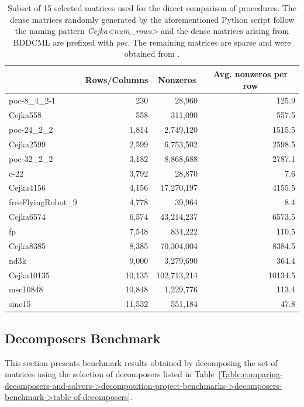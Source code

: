 \begin{table}[ht!]
	\centering
	\begin{tabular}{|l|r|r|r|}
		\hline
		\rowcolor[HTML]{C0C0C0} \multicolumn{1}{|c|}{\textbf{Matrix}} & \multicolumn{1}{c|}{\textbf{Rows/Columns}} & \multicolumn{1}{c|}{\textbf{Nonzeros}} & \multicolumn{1}{c|}{\textbf{Avg. nonzeros per row}} \\ \hline
		poc-8\_4\_2-1      &    230 &      28,960 &   125.9 \\
		Cejka558           &    558 &     311,090 &   557.5 \\
		poc-24\_2\_2       &  1,814 &   2,749,120 &  1515.5 \\
		Cejka2599          &  2,599 &   6,753,502 &  2598.5 \\
		poc-32\_2\_2       &  3,182 &   8,868,688 &  2787.1 \\
		c-22               &  3,792 &      28,870 &     7.6 \\
		Cejka4156          &  4,156 &  17,270,197 &  4155.5 \\
		freeFlyingRobot\_9 &  4,778 &      39,964 &     8.4 \\
		Cejka6574          &  6,574 &  43,214,237 &  6573.5 \\
		fp                 &  7,548 &     834,222 &   110.5 \\
		Cejka8385          &  8,385 &  70,304,004 &  8384.5 \\
		nd3k               &  9,000 &   3,279,690 &   364.4 \\
		Cejka10135         & 10,135 & 102,713,214 & 10134.5 \\
		msc10848           & 10,848 &   1,229,776 &   113.4 \\
		sinc15             & 11,532 &     551,184 &    47.8 \\ \hline
	\end{tabular}
	\caption{Subset of 15 selected matrices used for the direct comparison of procedures. The dense matrices randomly generated by the aforementioned Python script follow the naming pattern \textit{Cejka<num\_rows>} and the dense matrices arising from BDDCML are prefixed with \textit{poc}. The remaining matrices are sparse and were obtained from  \cite{Davis2011}.}
	\label{Table:comparing-decomposers-and-solvers->decomposition-project-benchmarks->matrices-used-for-benchmarks->15-selected-matrices}
\end{table}



\subsection{Decomposers Benchmark}\label{Subsection:comparing-decomposers-and-solvers->decomposition-project-benchmarks->decomposers-benchmark}
This section presents benchmark results obtained by decomposing the set of matrices using the selection of decomposers listed in Table~\ref{Table:comparing-decomposers-and-solvers->decomposition-project-benchmarks->decomposers-benchmark->table-of-decomposers}.

